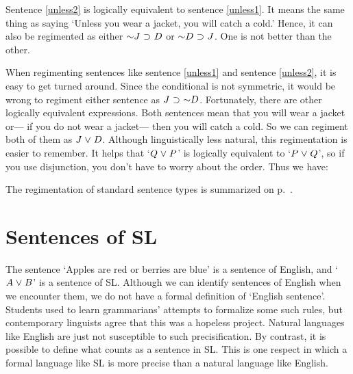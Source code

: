 Sentence \ref{unless2} is logically equivalent to sentence \ref{unless1}. 
It means the same thing as saying `Unless you wear a jacket, you will catch a cold.' 
Hence, it can also be regimented as either $\enot J \eif D$ or $\enot D \eif J$.
One is not better than the other.

When regimenting sentences like sentence \ref{unless1} and sentence \ref{unless2}, it is easy to get turned around.
Since the conditional is not symmetric, it would be wrong to regiment either sentence as $J \eif \enot D$.
Fortunately, there are other logically equivalent expressions.
Both sentences mean that you will wear a jacket or--- if you do not wear a jacket--- then you will catch a cold.
So we can regiment both of them as $J \mkern1mu\vee\mkern1mu D$.
Although linguistically less natural, this regimentation is easier to remember.
It helps that  `$Q \mkern1mu\vee\mkern1mu P$' is logically equivalent to `$P \mkern1mu\vee\mkern1mu Q$', so if you use disjunction, you don't have to worry about the order.
Thus we have:



The regimentation of standard sentence types is summarized on p.~\pageref{app.notation}.





\section{Sentences of SL}
\label{sec:sentencesofSL}
The sentence `Apples are red or berries are blue' is a sentence of English, and `$A\mkern1mu\vee\mkern1mu B$' is a sentence of SL.
Although we can identify sentences of English when we encounter them, we do not have a formal definition of `English sentence'.
Students used to learn grammarians' attempts to formalize some such rules, but contemporary linguists agree that this was a hopeless project.
Natural languages like English are just not susceptible to such precisification.
By contrast, it is possible to define what counts as a sentence in SL.
This is one respect in which a formal language like SL is more precise than a natural language like English.

